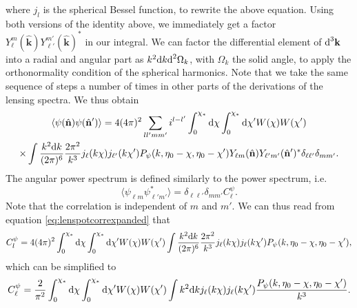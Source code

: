 \documentclass[11pt]{article} %
\DeclareRobustCommand{\d}{\ifmmode\text{d}\else d\fi}
\begin{document}
where $j_l$ is the spherical Bessel function, to rewrite the above equation. Using both versions of the identity above, we immediately get a factor $Y_\ell^m(\hat{\mathbf k})Y_{\ell'}^{m'}(\hat{\mathbf k})^*$ in our integral. We can factor the differential element of $\d^3\mathbf k$ into a radial and angular part as $k^2\d k\d^2\Omega_k$, with $\Omega_k$ the solid angle, to apply the orthonormality condition of the spherical harmonics. Note that we take the same sequence of steps a number of times in other parts of the derivations of the lensing spectra. We thus obtain
\begin{gather}
    \langle \psi(\hat{\mathbf n})\psi(\hat{\mathbf n}') \rangle = 4(4\pi)^2\sum_{ll'mm'}i^{l-l'}\int_0^{\chi_*}\d \chi\int_0^{\chi_*}\d \chi' W(\chi)W(\chi')\\\times\int \frac{k^2\d k}{(2\pi)^6}\frac{2\pi^2}{k^3}j_\ell(k\chi)j_{\ell'}(k\chi')P_\psi(k,\eta_0 - \chi, \eta_0-\chi')Y_{\ell m}(\hat{\mathbf n})Y_{\ell'm'}(\hat{\mathbf n}')^*\delta_{\ell \ell'}\delta_{mm'}. \label{eq:lenspotcorrexpanded}
\end{gather}
The angular power spectrum is defined similarly to the power spectrum, i.e.
\begin{equation}
    \langle \psi_{\ell m}\psi_{\ell'm'}^* \rangle = \delta_{\ell \ell'}\delta_{mm'}C_\ell^\psi.
\end{equation}
Note that the correlation is independent of $m$ and $m'$.
We can thus read from equation \ref{eq:lenspotcorrexpanded} that
\begin{gather}
    C_l^\psi = 4(4\pi)^2\int_0^{\chi_*}\d \chi\int_0^{\chi_*}\d \chi' W(\chi)W(\chi')\int \frac{k^2\d k}{(2\pi)^6}\frac{2\pi^2}{k^3}j_\ell(k\chi)j_{\ell}(k\chi')P_\psi(k,\eta_0 - \chi, \eta_0-\chi'),
\end{gather}
which can be simplified to
\begin{gather}
    C_\ell^\psi = \frac{2}{\pi^2}\int_0^{\chi_*}\d \chi\int_0^{\chi_*}\d \chi' W(\chi)W(\chi')\int k^2\d kj_\ell(k\chi)j_{\ell}(k\chi')\frac{P_\psi(k,\eta_0 - \chi, \eta_0-\chi')}{k^3}.
\end{gather}
\end{document}
